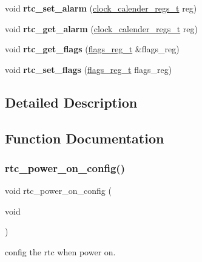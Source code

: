 \begin{DoxyCompactItemize}
void {\bfseries rtc\+\_\+set\+\_\+alarm} (\hyperlink{struct__clock__calender__regs__t__}{clock\+\_\+calender\+\_\+regs\+\_\+t} reg)
\item 
\mbox{\label{group___r_t_c_ga2c9f2b53c3a1e6e84242fb8ba66bf2c1}} 
void {\bfseries rtc\+\_\+get\+\_\+alarm} (\hyperlink{struct__clock__calender__regs__t__}{clock\+\_\+calender\+\_\+regs\+\_\+t} reg)
\item 
\mbox{\label{group___r_t_c_ga0fd8fc6c3246b4d097abbda3972f6c66}} 
void {\bfseries rtc\+\_\+get\+\_\+flags} (\hyperlink{union__flags__reg__t__}{flags\+\_\+reg\+\_\+t} \&flags\+\_\+reg)
\item 
\mbox{\label{group___r_t_c_gadd08aa1a6797a69bbbb69cf7bf812050}} 
void {\bfseries rtc\+\_\+set\+\_\+flags} (\hyperlink{union__flags__reg__t__}{flags\+\_\+reg\+\_\+t} flags\+\_\+reg)
\end{DoxyCompactItemize}


\subsection{Detailed Description}


\subsection{Function Documentation}
\mbox{\label{group___r_t_c_gadfdd04b6463b9cbaa7d0953cbee7ee44}} 
\subsubsection{\texorpdfstring{rtc\+\_\+power\+\_\+on\+\_\+config()}{rtc\_power\_on\_config()}}
{\footnotesize\ttfamily void rtc\+\_\+power\+\_\+on\+\_\+config (\begin{DoxyParamCaption}\item[{void}]{ }\end{DoxyParamCaption})}



config the rtc when power on. 


